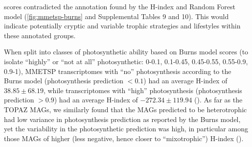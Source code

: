 \documentclass[12pt]{article}
\numberwithin{equation}{section}
\begin{document}
scores contradicted the annotation found by the H-index and Random Forest model (\cref{fig:mmetsp-burns} and Supplemental Tables 9 and 10). This would indicate potentially cryptic and variable trophic strategies and lifestyles within these annotated groups. 

When split into classes of photosynthetic ability based on Burns model scores (to isolate ``highly'' or ``not at all'' photosynthetic: 0-0.1, 0.1-0.45, 0.45-0.55, 0.55-0.9, 0.9-1), MMETSP transcriptomes with ``no'' photosynthesis according to the Burns model (photosynthesis prediction $<0.1$) had an average H-index of $38.85\pm68.19$, while transcriptomes with ``high'' photosynthesis (photosynthesis prediction $>0.9$) had an average H-index of $-272.34\pm119.94$ (). As far as the TOPAZ MAGs, we similarly found that the MAGs predicted to be heterotrophic had low variance in photosynthesis prediction as reported by the Burns model, yet the variability in the photosynthetic prediction was high, in particular among those MAGs of higher (less negative, hence closer to ``mixotrophic'') H-index (). 
\end{document}
